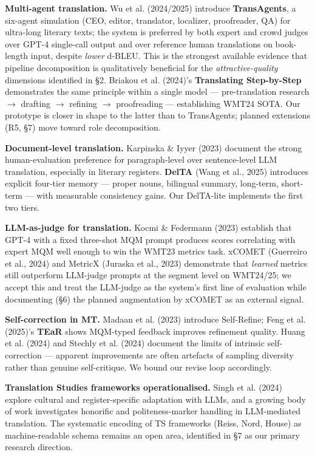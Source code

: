 \documentclass[11pt]{article}
\begin{document}
\textbf{Multi-agent translation.} Wu et al. (2024/2025) introduce \textbf{TransAgents}, a six-agent simulation (CEO, editor, translator, localizer, proofreader, QA) for ultra-long literary texts; the system is preferred by both expert and crowd judges over GPT-4 single-call output and over reference human translations on book-length input, despite \emph{lower} d-BLEU. This is the strongest available evidence that pipeline decomposition is qualitatively beneficial for the \emph{attractive-quality} dimensions identified in \S{}2. Briakou et al. (2024)'s \textbf{Translating Step-by-Step} demonstrates the same principle within a single model --- pre-translation research $\rightarrow$ drafting $\rightarrow$ refining $\rightarrow$ proofreading --- establishing WMT24 SOTA. Our prototype is closer in shape to the latter than to TransAgents; planned extensions (R5, \S{}7) move toward role decomposition.

\textbf{Document-level translation.} Karpinska \& Iyyer (2023) document the strong human-evaluation preference for paragraph-level over sentence-level LLM translation, especially in literary registers. \textbf{DelTA} (Wang et al., 2025) introduces explicit four-tier memory --- proper nouns, bilingual summary, long-term, short-term --- with measurable consistency gains. Our DelTA-lite implements the first two tiers.

\textbf{LLM-as-judge for translation.} Kocmi \& Federmann (2023) establish that GPT-4 with a fixed three-shot MQM prompt produces scores correlating with expert MQM well enough to win the WMT23 metrics task. xCOMET (Guerreiro et al., 2024) and MetricX (Juraska et al., 2023) demonstrate that \emph{learned} metrics still outperform LLM-judge prompts at the segment level on WMT24/25; we accept this and treat the LLM-judge as the system's first line of evaluation while documenting (\S{}6) the planned augmentation by xCOMET as an external signal.

\textbf{Self-correction in MT.} Madaan et al. (2023) introduce Self-Refine; Feng et al. (2025)'s \textbf{TEaR} shows MQM-typed feedback improves refinement quality. Huang et al. (2024) and Stechly et al. (2024) document the limits of intrinsic self-correction --- apparent improvements are often artefacts of sampling diversity rather than genuine self-critique. We bound our revise loop accordingly.

\textbf{Translation Studies frameworks operationalised.} Singh et al. (2024) explore cultural and register-specific adaptation with LLMs, and a growing body of work investigates honorific and politeness-marker handling in LLM-mediated translation. The systematic encoding of TS frameworks (Reiss, Nord, House) as machine-readable schema remains an open area, identified in \S{}7 as our primary research direction.
\end{document}

